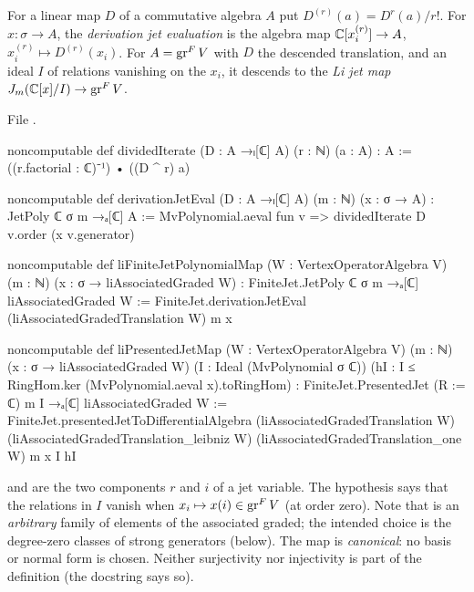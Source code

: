 \begin{definition}\label{l11:def:jetmap}
For a linear map $D$ of a commutative algebra $A$ put $D^{(r)}(a) = D^r(a)/r!$. For $x:\sigma\to A$, the
\emph{derivation jet evaluation} is the algebra map ${\mathbb{C}}[x_i^{(r)}]\to A$, $x_i^{(r)}\mapsto D^{(r)}(x_i)$. For
$A = \operatorname{gr}^FV$ with $D$ the descended translation, and an ideal $I$ of relations vanishing on the $x_i$, it
descends to the \emph{Li jet map} $J_m({\mathbb{C}}[x]/I)\to\operatorname{gr}^FV$.
\end{definition}
\noindent File .
\begin{leancode}
noncomputable def dividedIterate (D : A →ₗ[ℂ] A) (r : ℕ) (a : A) : A :=
  ((r.factorial : ℂ)⁻¹) • ((D ^ r) a)

noncomputable def derivationJetEval (D : A →ₗ[ℂ] A) (m : ℕ) (x : σ → A) :
    JetPoly ℂ σ m →ₐ[ℂ] A :=
  MvPolynomial.aeval fun v => dividedIterate D v.order (x v.generator)

noncomputable def liFiniteJetPolynomialMap (W : VertexOperatorAlgebra V) (m : ℕ)
    (x : σ → liAssociatedGraded W) :
    FiniteJet.JetPoly ℂ σ m →ₐ[ℂ] liAssociatedGraded W :=
  FiniteJet.derivationJetEval (liAssociatedGradedTranslation W) m x

noncomputable def liPresentedJetMap (W : VertexOperatorAlgebra V) (m : ℕ)
    (x : σ → liAssociatedGraded W) (I : Ideal (MvPolynomial σ ℂ))
    (hI : I ≤ RingHom.ker (MvPolynomial.aeval x).toRingHom) :
    FiniteJet.PresentedJet (R := ℂ) m I →ₐ[ℂ] liAssociatedGraded W :=
  FiniteJet.presentedJetToDifferentialAlgebra (liAssociatedGradedTranslation W)
    (liAssociatedGradedTranslation_leibniz W) (liAssociatedGradedTranslation_one W) m x I hI
\end{leancode}

\begin{dictionary}
 and  are the two components $r$ and $i$ of a jet variable. The hypothesis
\allowbreak{}\allowbreak{}\allowbreak{} says that the relations in $I$ vanish when
$x_i\mapsto x(i)\in\operatorname{gr}^FV$ (at order zero). Note that  is an \emph{arbitrary} family of elements of
the associated graded; the intended choice is the degree-zero classes of strong generators (below). The map is
\emph{canonical}: no basis or normal form is chosen. Neither surjectivity nor injectivity is part of the
definition (the docstring says so).
\end{dictionary}

